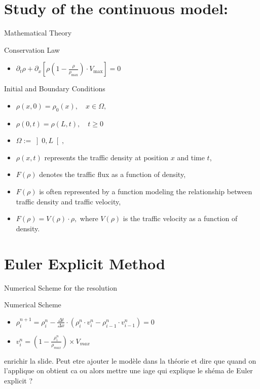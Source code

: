 \documentclass{beamer}
\begin{document}
\section{Study of the continuous model:}
\begin{frame}{Mathematical Theory}
	\begin{alertblock}{Conservation Law}
		\begin{itemize}
			\item $\partial_t\rho + \partial_x\left[ \rho\left( 1-\frac{\rho}{\rho_{\text{max}}}\right) \cdot V_{\text{max}}\right] = 0 $
		\end{itemize}
	\end{alertblock}
	\begin{block}{Initial and Boundary Conditions}
		\begin{itemize}
			\item $\rho(x,0) = \rho_0(x), \quad x \in \Omega,$
			\item $\rho(0,t) = \rho(L,t), \quad t \geq 0$
			\item $\Omega := \left] 0,L\right[, $
			\item $\rho(x,t)$ represents the traffic density at position $x$ and time $t$, 
			\item $F(\rho)$ denotes the traffic flux as a function of density,
			\item $F(\rho)$ is often represented by a function modeling the relationship between traffic density and traffic velocity,
			\item $F(\rho) = V(\rho) \cdot \rho,$ where $V(\rho)$ is the traffic velocity as a function of density.
		\end{itemize}
	\end{block}
\end{frame}

\section{Euler Explicit Method}
\begin{frame}{Numerical Scheme for the resolution}
	\begin{alertblock}{Numerical Scheme}
		\begin{itemize}
			\item $\rho_{i}^{n+1} = \rho_i^n - \frac{\Delta t}{\Delta x} \cdot \left(\rho_i^n \cdot v_i^n - \rho_{i-1}^n \cdot v_{i-1}^n \right)
					=0$
		
			\item $v_i^n = \left( 1 - \frac{\rho_i^n}{\rho_{max}}\right)  \times V_{max}$
		\end{itemize}
	\end{alertblock}
	enrichir la slide. Peut etre ajouter le modèle dans la théorie et dire que quand on l'applique on obtient ca ou alors mettre une iage qui explique le shéma de Euler explicit ? 

\end{frame}
\end{document}

